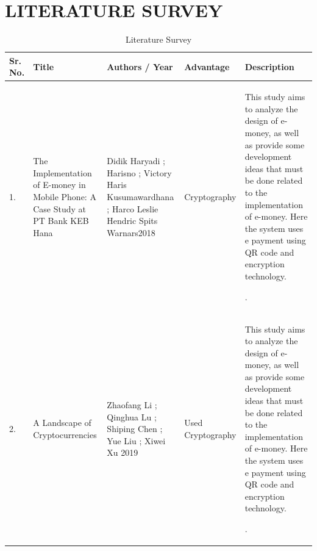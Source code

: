 \documentclass[oneside,a4paper,12pt]{report}
\begin{document}
\chapter{LITERATURE SURVEY}
\begin{table}[!htbp]
\begin{center}
\caption{Literature Survey}
\label{tab:Literature Survey}
\def\arraystretch{1.5}
\begin{tabular}{| p{0.5cm} | p{2cm} |p{2cm}| p{2cm} | p{5.5cm} |} \hline
\textbf{Sr. No.} & \textbf{Title} & \textbf{Authors / Year}& \textbf{Advantage} & \textbf{Description} \\ \hline
1. & The Implementation of E-money in Mobile Phone: A Case Study at PT Bank KEB Hana
   & Didik Haryadi ; Harisno ; Victory Haris Kusumawardhana ; Harco Leslie Hendric Spits Warnars2018
   & Cryptography
   & This study aims to analyze the design of e-money, as well as provide some development ideas that must be done related to the implementation of e-money. Here the system uses e payment using QR code and encryption technology.

. \\ \hline

2. & A Landscape of Cryptocurrencies


   & Zhaofang Li ; Qinghua Lu ; Shiping Chen ; Yue Liu ; Xiwei Xu 2019


   & Used Cryptography
   & This study aims to analyze the design of e-money, as well as provide some development ideas that must be done related to the implementation of e-money. Here the system uses e payment using QR code and encryption technology.

. \\ \hline
\end{tabular}
\end{center}
\end{table}
\end{document}
